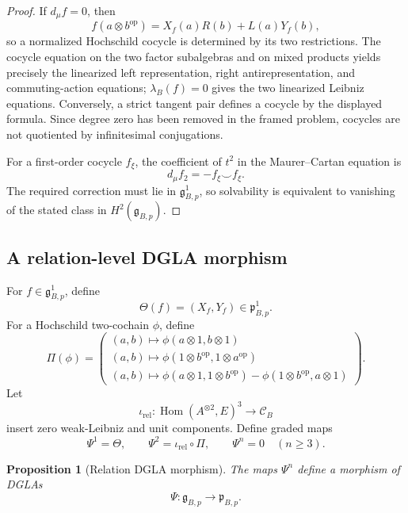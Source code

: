 \documentclass[11pt]{amsart}
\newtheorem{proposition}[theorem]{Proposition}
\newcommand{\Hom}{\operatorname{Hom}}
\newcommand{\gpres}{\mathfrak p}
\newcommand{\ghoch}{\mathfrak g}
\newcommand{\Rel}{\mathscr C}
\begin{document}
\begin{proof}
If $d_\mu f=0$, then
\[
f(a\otimes b^{\mathrm{op}})
=X_f(a)R(b)+L(a)Y_f(b),
\]
so a normalized Hochschild cocycle is determined by its two restrictions.  The cocycle equation on the two factor subalgebras and on mixed products yields precisely the linearized left representation, right antirepresentation, and commuting-action equations; $\lambda_B(f)=0$ gives the two linearized Leibniz equations.  Conversely, a strict tangent pair defines a cocycle by the displayed formula.  Since degree zero has been removed in the framed problem, cocycles are not quotiented by infinitesimal conjugations.

For a first-order cocycle $f_\xi$, the coefficient of $t^2$ in the Maurer--Cartan equation is
\[
d_\mu f_2=-f_\xi\smile f_\xi.
\]
The required correction must lie in $\ghoch^1_{B,p}$, so solvability is equivalent to vanishing of the stated class in $H^2(\ghoch_{B,p})$.
\end{proof}

\subsection{A relation-level DGLA morphism}

For $f\in\ghoch_{B,p}^{1}$, define
\[
\Theta(f)=(X_f,Y_f)\in\gpres_{B,p}^{1}.
\]
For a Hochschild two-cochain $\phi$, define
\[
\Pi(\phi)=
\begin{pmatrix}
(a,b)\mapsto\phi(a\otimes1,b\otimes1)\\
(a,b)\mapsto\phi(1\otimes b^{\mathrm{op}},1\otimes a^{\mathrm{op}})\\
(a,b)\mapsto\phi(a\otimes1,1\otimes b^{\mathrm{op}})-\phi(1\otimes b^{\mathrm{op}},a\otimes1)
\end{pmatrix}.
\]
Let
\[
\iota_{\mathrm{rel}}:
\Hom(A^{\otimes2},E)^3\longrightarrow\Rel_B
\]
insert zero weak-Leibniz and unit components.  Define graded maps
\[
\Psi^1=\Theta,
\qquad
\Psi^2=\iota_{\mathrm{rel}}\circ\Pi,
\qquad
\Psi^n=0\quad(n\ge3).
\]

\begin{proposition}[Relation DGLA morphism]\label{prop:relation-dgla-morphism}
The maps $\Psi^n$ define a morphism of DGLAs
\[
\Psi:\ghoch_{B,p}\longrightarrow\gpres_{B,p}.
\]
\end{proposition}
\end{document}
